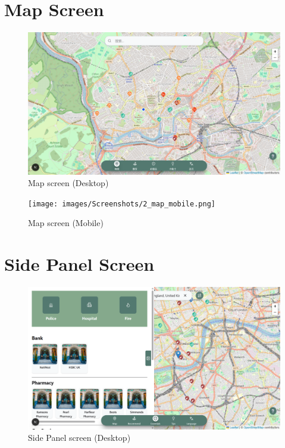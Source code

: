 \section{Map Screen}
\begin{figure}[H]
    \centering
    \includegraphics[height=0.3\textheight,keepaspectratio]{images/Screenshots/2_map_desktop.png}
    \caption{Map screen (Desktop)}
\end{figure}

\begin{figure}[H]
    \centering
    \texttt{[image: images/Screenshots/2\_map\_mobile.png]}
    \caption{Map screen (Mobile)}
\end{figure}

\section{Side Panel Screen}
\begin{figure}[H]
    \centering
    \includegraphics[height=0.3\textheight,keepaspectratio]{images/Screenshots/3_sidepanel_desktop.png}
    \caption{Side Panel screen (Desktop)}
\end{figure}

